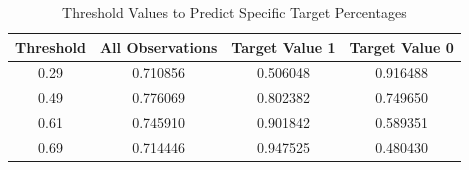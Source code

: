 \documentclass[a4paper,12pt]{article}
\numberwithin{equation}{section}
\numberwithin{figure}{section}
\numberwithin{table}{section}
\begin{document}
\begin{table}[!htb]
    \centering
    \caption{Threshold Values to Predict Specific Target Percentages}
    \label{tab:predict}
    \begin{tabular}{cccc}
    \toprule
    Threshold & All Observations & Target Value 1 & Target Value 0 \\\midrule
    0.29 & 0.710856	& 0.506048 & 	0.916488 \\	
    0.49 & 0.776069	& 0.802382 & 	0.749650	 \\	
    0.61 & 0.745910	& 0.901842 & 	0.589351 \\	
    0.69 & 0.714446	& 0.947525 & 	0.480430 \\\bottomrule
    \end{tabular}
\end{table}
\end{document}
